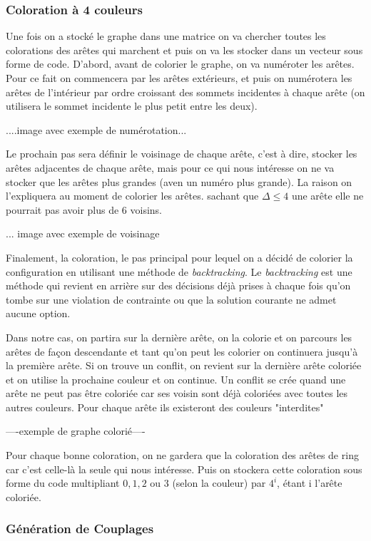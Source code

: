 \documentclass[10pt,a4paper]{article}
\begin{document}
\subsubsection{Coloration à 4 couleurs}

Une fois on a stocké le graphe dans une matrice on va chercher toutes les colorations des arêtes qui marchent et puis on va les stocker dans un vecteur sous forme de code. D'abord, avant de colorier le graphe, on va numéroter les arêtes. Pour ce fait on commencera par les arêtes extérieurs, et puis on numérotera les arêtes de l'intérieur par ordre croissant des sommets incidentes à chaque arête (on utilisera le sommet incidente le plus petit entre les deux).

....image avec exemple de numérotation...

Le prochain pas sera définir le voisinage de chaque arête, c'est à dire, stocker les arêtes adjacentes de chaque arête, mais pour ce qui nous intéresse on ne va stocker que les arêtes plus grandes (aven un numéro plus grande). La raison on l'expliquera au moment de colorier les arêtes. sachant que $\Delta \leq 4$ une arête elle ne pourrait pas avoir plus de 6 voisins.

... image avec exemple de voisinage

Finalement, la coloration, le pas principal pour lequel on a décidé de colorier la configuration en utilisant une méthode de \emph{backtracking}. Le \emph{backtracking} est une méthode qui revient en arrière sur des décisions déjà prises à chaque fois qu'on tombe sur une violation de contrainte ou que la solution courante ne admet aucune option. 

Dans notre cas, on partira sur la dernière arête, on la colorie et on parcours les arêtes de façon descendante et tant qu'on peut les colorier on continuera jusqu'à la première arête. Si on trouve un conflit, on revient sur la dernière arête coloriée et on utilise la prochaine couleur et on continue. Un conflit se crée quand une arête ne peut pas être coloriée car ses voisin sont déjà coloriées avec toutes les autres couleurs. Pour chaque arête ils existeront des couleurs "interdites" 

----exemple de graphe colorié----

Pour chaque bonne coloration, on ne gardera que la coloration des arêtes de ring car c'est celle-là la seule qui nous intéresse. Puis on stockera cette coloration sous forme du code multipliant $0,1,2$ ou $3$ (selon la couleur) par $4^{i}$, étant i l'arête coloriée.
\subsubsection{Génération de Couplages}
\end{document}
